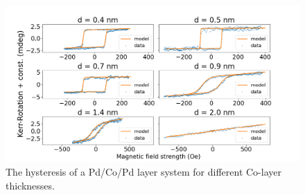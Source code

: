\begin{figure}
	\centering
	\includegraphics[width=1.0\textwidth]{./fig/ferromagnet_measurement.png}
	\caption{The hysteresis of a Pd/Co/Pd layer system for different Co-layer
	thicknesses.}
	\label{fig:ferromagnet-measurement}
\end{figure}




